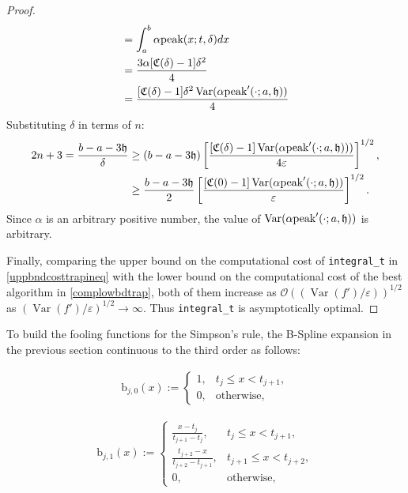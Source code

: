 \documentclass{iitthesis}
\DeclareMathOperator{\Var}{Var}
\theoremstyle{definition}
\theoremstyle{remark}
\begin{document}
\begin{proof}
\begin{subequations}
\begin{align*}
     &=\int_{a}^{b}\alpha\textup{peak}(x;t,\delta)dx\\
     &=\frac{3\alpha[\mathfrak{C}(\delta)-1]\delta^2}{4}\\
     &=\frac{[\mathfrak{C}(\delta)-1]\delta^2\Var(\alpha\textup{peak}'(\cdot;a,\mathfrak{h}))}{4}
  \end{align*}
  \end{subequations}
  Substituting $\delta$  in terms of $n$:
      \begin{align*}
        2n+3=\frac{b-a-3\mathfrak{h}}{\delta}&\ge(b-a-3\mathfrak{h})\left[\frac{[\mathfrak{C}(\delta)-1]\Var(\alpha \textup{peak}'(\cdot;a,\mathfrak{h})))}{4\varepsilon}\right]^{1/2},\\
        &\ge\frac{b-a-3\mathfrak{h}}{2}\left[\frac{[\mathfrak{C}(0)-1]\Var(\alpha \textup{peak}'(\cdot;a,\mathfrak{h}))}{\varepsilon}\right]^{1/2}.
    \end{align*}
    Since $\alpha$ is an arbitrary positive number, the value of $\Var(\alpha \textup{peak}'(\cdot;a,\mathfrak{h}))$ is arbitrary.

    Finally, comparing the upper bound on the computational cost of {\tt integral\_t} in \eqref{uppbndcosttrapineq} with the lower bound on the computational cost of the best algorithm in \eqref{complowbdtrap}, both of them increase as $\mathcal{O}((\Var(f')/\varepsilon))^{1/2}$ as $(\Var(f')/\varepsilon)^{1/2}\rightarrow \infty$. Thus {\tt integral\_t} is asymptotically optimal.
\end{proof}


To build the fooling functions for the Simpson's rule, the B-Spline expansion in the previous section continuous to the third order as follows:

\begin{align*}
  \text{b}_{j,0}(x):= \begin{cases} \displaystyle 1, & t_{j} \le x < t_{j+1},\\[1ex]
\displaystyle  0, & \text{otherwise},
\end{cases}
\end{align*}

\begin{align*}
  \text{b}_{j,1}(x):= \begin{cases} \displaystyle \frac{x-t_{j}}{t_{j+1}-t_{j}}, & t_{j} \le x < t_{j+1},\\[1ex]
\displaystyle \frac{t_{j+2}-x}{t_{j+2}-t_{j+1}}, & t_{j+1} \le x < t_{j+2},\\[1ex]
\displaystyle  0, & \text{otherwise},
\end{cases}
\end{align*}
\end{document}

